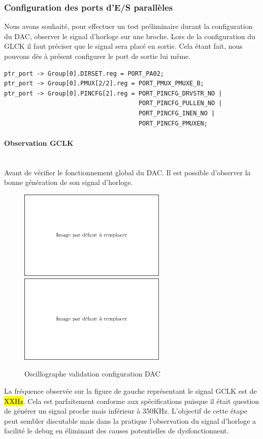 \documentclass[a4paper]{article}
\begin{document}
\subsubsection{Configuration des ports d’E/S parallèles}
Nous avons souhaité, pour effectuer un test préliminaire durant la configuration du DAC, observer le signal d'horloge sur une broche. Lors de la configuration du GLCK il faut préciser que le signal sera placé en sortie. Cela étant fait, nous pouvons dès à présent configurer le port de sortie lui même.
\begin{lstlisting}[style=CStyle]
ptr_port -> Group[0].DIRSET.reg = PORT_PA02;
ptr_port -> Group[0].PMUX[2/2].reg = PORT_PMUX_PMUXE_B;
ptr_port -> Group[0].PINCFG[2].reg = PORT_PINCFG_DRVSTR_NO |
                                     PORT_PINCFG_PULLEN_NO |
                                     PORT_PINCFG_INEN_NO |
                                     PORT_PINCFG_PMUXEN;
\end{lstlisting}
\paragraph{Observation GCLK} ~~\\
Avant de vérifier le fonctionnement global du DAC. Il est possible d'observer la bonne génération de son signal d'horloge.
\begin{figure}[H]
	\centering
	\includegraphics[width=7cm]{defaut}
	\includegraphics[width=7cm]{defaut}
	\caption{Oscillographe validation configuration DAC}
\end{figure}
La fréquence observée sur la figure de gauche représentant le signal GCLK est de \hl{XXHz}. Cela est parfaitement conforme aux spécifications puisque il était question de générer un signal proche mais inférieur à 350KHz. L'objectif de cette étape peut sembler discutable mais dans la pratique l'observation du signal d'horloge a facilité le debug en éliminant des causes potentielles de dysfonctionnent.
  
\end{document}
